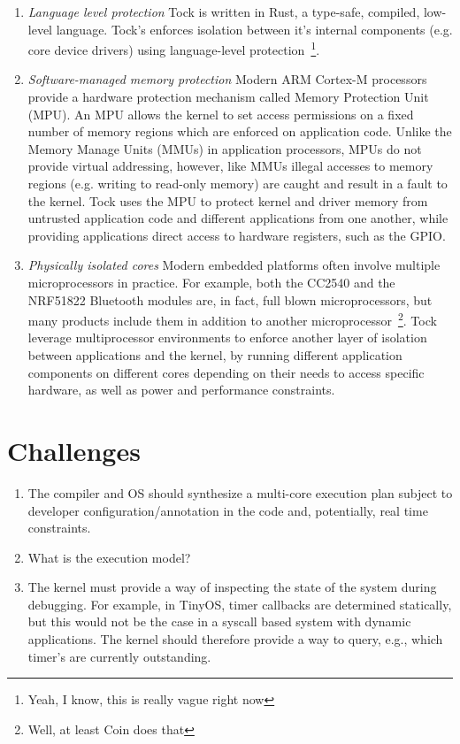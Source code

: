 \documentclass{article}
\begin{document}
  \begin{enumerate}
    \item \emph{Language level protection} Tock is written in Rust, a type-safe,
    compiled, low-level language. Tock's enforces isolation between it's
    internal components (e.g. core device drivers) using language-level
    protection~\footnote{Yeah, I know, this is really vague right now}.
    
    \item \emph{Software-managed memory protection} Modern ARM Cortex-M
    processors provide a hardware protection mechanism called Memory Protection
    Unit (MPU).  An MPU allows the kernel to set access permissions on a fixed
    number of memory regions which are enforced on application code. Unlike the
    Memory Manage Units (MMUs) in application processors, MPUs do not provide
    virtual addressing, however, like MMUs illegal accesses to memory regions
    (e.g. writing to read-only memory) are caught and result in a fault to the
    kernel. Tock uses the MPU to protect kernel and driver memory from untrusted
    application code and different applications from one another, while
    providing applications direct access to hardware registers, such as the
    GPIO.

    \item \emph{Physically isolated cores} Modern embedded platforms often
    involve multiple microprocessors in practice. For example, both the CC2540
    and the NRF51822 Bluetooth modules are, in fact, full blown microprocessors,
    but many products include them in addition to another
    microprocessor~\footnote{Well, at least Coin does that}. Tock leverage
    multiprocessor environments to enforce another layer of isolation between
    applications and the kernel, by running different application components on
    different cores depending on their needs to access specific hardware, as
    well as power and performance constraints.

  \end{enumerate}

  \section{Challenges}

  \begin{enumerate}
    \item The compiler and OS should synthesize a multi-core execution plan
    subject to developer configuration/annotation in the code and, potentially,
    real time constraints.

    \item What is the execution model?

    \item The kernel must provide a way of inspecting the state of the system
    during debugging. For example, in TinyOS, timer callbacks are determined
    statically, but this would not be the case in a syscall based system with
    dynamic applications. The kernel should therefore provide a way to query,
    e.g., which timer's are currently outstanding.

  \end{enumerate}
\end{document}
